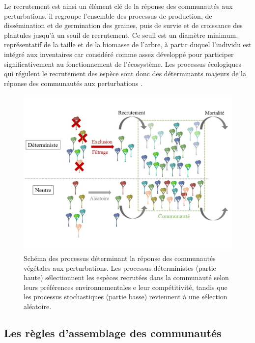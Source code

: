 \documentclass[
  11pt,
  french,
  A4paper,
  extrafontsizes,onecolumn,openright
  ]{memoir}
\begin{document}
Le recrutement est ainsi un élément clé de la réponse des communautés
aux perturbations. il regroupe l'ensemble des processus de production,
de dissémination et de germination des graines, puis de survie et de
croissance des plantules jusqu'à un seuil de recrutement. Ce seuil est
un diamètre minimum, représentatif de la taille et de la biomasse de
l'arbre, à partir duquel l'individu est intégré aux inventaires car
considéré comme assez développé pour participer significativement au
fonctionnement de l'écosystème. Les processus écologiques qui régulent
le recrutement des espèce sont donc des déterminants majeurs de la
réponse des communautés aux perturbations
\autocites{Denslow1980}{Schnitzer2001}{Asner2004}.

\begin{figure}

{\centering \includegraphics[width=1\linewidth]{ExternalFig/Fig_AssemblyRules} 

}

\caption{Schéma des processus déterminant la réponse des communautés végétales aux perturbations. Les processus déterministes (partie haute) sélectionnent les espèces recrutées dans la communauté selon leurs préférences environnementales e leur compétitivité, tandis que les processus stochastiques (partie basse) reviennent à une sélection aléatoire.}\label{fig:AssemblyRules}
\end{figure}

\subsection{Les règles d'assemblage des
communautés}\label{les-regles-dassemblage-des-communautes}
\end{document}
